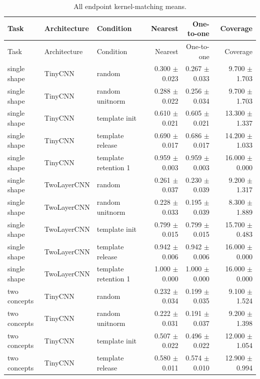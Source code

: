 {\footnotesize
\setlength{\tabcolsep}{2.5pt}
\begin{longtable}{p{.15\linewidth}p{.17\linewidth}p{.20\linewidth}rrr}
\caption{All endpoint kernel-matching means.}\label{tab:kernel-matching-full}\\
\toprule
Task & Architecture & Condition & Nearest & One-to-one & Coverage \\
\midrule
\endfirsthead
\toprule
Task & Architecture & Condition & Nearest & One-to-one & Coverage \\
\midrule
\endhead
\bottomrule
\endfoot
single shape & TinyCNN & random & 0.300 $\pm$ 0.023 & 0.267 $\pm$ 0.033 & 9.700 $\pm$ 1.703 \\
single shape & TinyCNN & random unitnorm & 0.288 $\pm$ 0.022 & 0.256 $\pm$ 0.034 & 9.700 $\pm$ 1.703 \\
single shape & TinyCNN & template init & 0.610 $\pm$ 0.021 & 0.605 $\pm$ 0.021 & 13.300 $\pm$ 1.337 \\
single shape & TinyCNN & template release & 0.690 $\pm$ 0.017 & 0.686 $\pm$ 0.017 & 14.200 $\pm$ 1.033 \\
single shape & TinyCNN & template retention 1 & 0.959 $\pm$ 0.003 & 0.959 $\pm$ 0.003 & 16.000 $\pm$ 0.000 \\
\addlinespace[2pt]
single shape & TwoLayerCNN & random & 0.261 $\pm$ 0.037 & 0.230 $\pm$ 0.039 & 9.200 $\pm$ 1.317 \\
single shape & TwoLayerCNN & random unitnorm & 0.228 $\pm$ 0.033 & 0.195 $\pm$ 0.039 & 8.300 $\pm$ 1.889 \\
single shape & TwoLayerCNN & template init & 0.799 $\pm$ 0.015 & 0.799 $\pm$ 0.015 & 15.700 $\pm$ 0.483 \\
single shape & TwoLayerCNN & template release & 0.942 $\pm$ 0.006 & 0.942 $\pm$ 0.006 & 16.000 $\pm$ 0.000 \\
single shape & TwoLayerCNN & template retention 1 & 1.000 $\pm$ 0.000 & 1.000 $\pm$ 0.000 & 16.000 $\pm$ 0.000 \\
\addlinespace[2pt]
two concepts & TinyCNN & random & 0.232 $\pm$ 0.034 & 0.199 $\pm$ 0.035 & 9.100 $\pm$ 1.524 \\
two concepts & TinyCNN & random unitnorm & 0.222 $\pm$ 0.031 & 0.191 $\pm$ 0.037 & 9.200 $\pm$ 1.398 \\
two concepts & TinyCNN & template init & 0.507 $\pm$ 0.022 & 0.496 $\pm$ 0.022 & 12.000 $\pm$ 1.054 \\
two concepts & TinyCNN & template release & 0.580 $\pm$ 0.011 & 0.574 $\pm$ 0.010 & 12.900 $\pm$ 0.994 \\

\end{longtable}}
